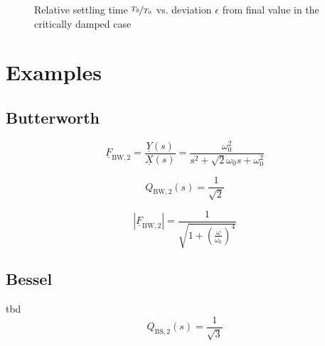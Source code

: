 \documentclass{article}[11pt]
\begin{document}
\begin{figure}[H]
  \centering
  \caption{Relative settling time $\nicefrac{T_{\mathrm{S}}}{T_{\mathrm{0}}}$
    vs. deviation $\epsilon$ from final value in the critically damped case}
  \label{fig:settling-crit-damped}
\end{figure}


\section{Examples}\label{sec:examples}

\subsection{Butterworth}\label{subsec:examples:butterworth}

\begin{equation}
\underline{F}_{\mathrm{BW,2}} = \frac{\underline{Y}(s)}{\underline{X}(s)} 
                 = \frac{\omega_0^2}{s^2 + \sqrt{2} \omega_0 s + \omega_0^2 }
\end{equation}



\begin{equation}
Q_{\mathrm{BW,2}}(s) = \frac{1}{\sqrt{2}}
\end{equation}

\begin{equation}
\left|\underline{F}_{\mathrm{BW,2}}\right|
                 = \frac{1}{\sqrt{1+\left(\frac{\omega}{\omega_0}\right)^4}}
\end{equation}

\subsection{Bessel}
tbd
\begin{equation}
Q_{\mathrm{BS,2}}(s) = \frac{1}{\sqrt{3}}
\end{equation}
\end{document}
